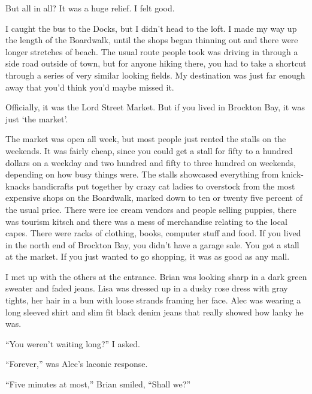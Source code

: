 But all in all?  It was a huge relief.  I felt good.



I caught the bus to the Docks, but I didn't head to the loft.  I made my way up the length of the Boardwalk, until the shops began thinning out and there were longer stretches of beach.  The usual route people took was driving in through a side road outside of town, but for anyone hiking there, you had to take a shortcut through a series of very similar looking fields.  My destination was just far enough away that you'd think you'd maybe missed it.



Officially, it was the Lord Street Market.  But if you lived in Brockton Bay, it was just `the market'.



The market was open all week, but most people just rented the stalls on the weekends.  It was fairly cheap, since you could get a stall for fifty to a hundred dollars on a weekday and two hundred and fifty to three hundred on weekends, depending on how busy things were.  The stalls showcased everything from knick-knacks handicrafts put together by crazy cat ladies to overstock from the most expensive shops on the Boardwalk, marked down to ten or twenty five percent of the usual price.  There were ice cream vendors and people selling puppies, there was tourism kitsch and there was a mess of merchandise relating to the local capes.  There were racks of clothing, books, computer stuff and food.  If you lived in the north end of Brockton Bay, you didn't have a garage sale.  You got a stall at the market.  If you just wanted to go shopping, it was as good as any mall.



I met up with the others at the entrance.  Brian was looking sharp in a dark green sweater and faded jeans.  Lisa was dressed up in a dusky rose dress with gray tights, her hair in a bun with loose strands framing her face.  Alec was wearing a long sleeved shirt and slim fit black denim jeans that really showed how lanky he was.



``You weren't waiting long?'' I asked.



``Forever,'' was Alec's laconic response.



``Five minutes at most,'' Brian smiled, ``Shall we?''



